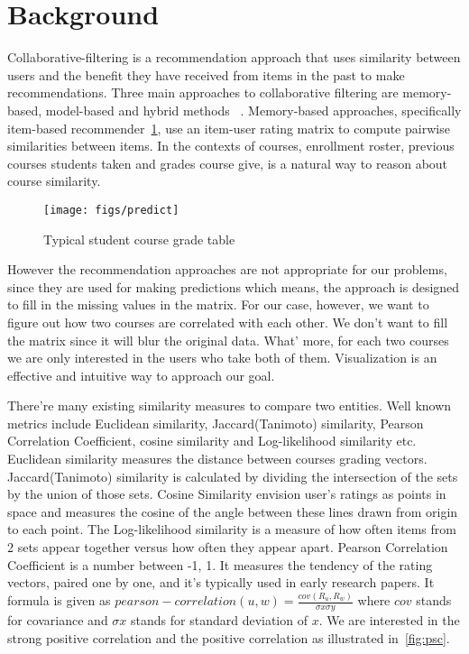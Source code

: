 \section{Background}
\label{sec:background}

Collaborative-filtering is a recommendation approach that uses similarity between users and the benefit they have received from items in the past to make recommendations. Three main approaches to collaborative filtering are memory-based, model-based and hybrid methods~\cite{Su:2009:SCF:1592474.1722966} . Memory-based approaches, specifically item-based recommender~\ref{fig:predict}, use an item-user rating matrix to compute pairwise similarities between items. In the contexts of courses, enrollment roster, previous courses students taken and grades course give, is a natural way to reason about course similarity.  

\begin{figure}[h]
 \centering %
 \texttt{[image: figs/predict]}
 \caption{Typical student course grade table}
 \label{fig:predict}
\end{figure}

However the recommendation approaches are not appropriate for our problems, since they are used for making predictions which means, the approach is designed to fill in the missing values in the matrix. For our case, however, we want to figure out how two courses are correlated with each other. We don’t want to fill the matrix since it will blur the original data. What’ more, for each two courses we are only interested in the users who take both of them. Visualization is an effective and intuitive way to approach our goal.  

There’re many existing similarity measures to compare two entities. Well known metrics include Euclidean similarity, Jaccard(Tanimoto) similarity, Pearson Correlation Coefficient, cosine similarity and Log-likelihood similarity etc. Euclidean similarity measures the distance between courses grading vectors. Jaccard(Tanimoto) similarity is calculated by dividing the intersection of the sets by the union of those sets\cite{sandvig2005aacorn}. Cosine Similarity envision user’s ratings as points in space and measures the cosine of the angle between these lines drawn from origin to each point. The Log-likelihood similarity is a measure of how often items from 2 sets appear together versus how often they appear apart. Pearson Correlation Coefficient is a number between -1, 1. It measures the tendency of the rating vectors, paired one by one, and it’s typically used in early research papers. It formula is given as $pearson-correlation(u,w) = \frac{cov(R_u,R_w)}{\sigma x \sigma y} $ where $cov$ stands for covariance and $\sigma x$ stands for standard deviation of $x$. We are interested in the strong positive correlation and the positive correlation as illustrated in~\ref{fig:psc}.

